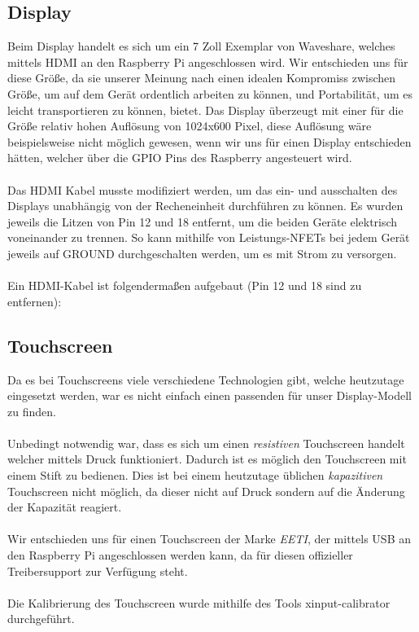 \subsection{Display}

Beim Display handelt es sich um ein 7 Zoll Exemplar von Waveshare, welches mittels HDMI an den Raspberry Pi angeschlossen wird. Wir entschieden uns für diese Größe, da sie unserer Meinung nach einen idealen Kompromiss zwischen Größe, um auf dem Gerät ordentlich arbeiten zu können, und Portabilität, um es leicht transportieren zu können, bietet. Das Display überzeugt mit einer für die Größe relativ hohen Auflösung von 1024x600 Pixel, diese Auflösung wäre beispielsweise nicht möglich gewesen, wenn wir uns für einen Display entschieden hätten, welcher über die GPIO Pins des Raspberry angesteuert wird.\\
\\
Das HDMI Kabel musste modifiziert werden, um das ein- und ausschalten des Displays unabhängig von der Recheneinheit durchführen zu können. Es wurden jeweils die Litzen von Pin 12 und 18 entfernt, um die beiden Geräte elektrisch voneinander zu trennen. So kann mithilfe von Leistungs-NFETs bei jedem Gerät jeweils auf GROUND durchgeschalten werden, um es mit Strom zu versorgen.\\
\\
Ein HDMI-Kabel ist folgendermaßen aufgebaut (Pin 12 und 18 sind zu entfernen): 

\subsection{Touchscreen}

Da es bei Touchscreens viele verschiedene Technologien gibt, welche heutzutage eingesetzt werden, war es nicht einfach einen passenden für unser Display-Modell zu finden.\\
\\
Unbedingt notwendig war, dass es sich um einen \textit{resistiven} Touchscreen handelt welcher mittels Druck funktioniert. Dadurch ist es möglich den Touchscreen mit einem Stift zu bedienen. Dies ist bei einem heutzutage üblichen \textit{kapazitiven} Touchscreen nicht möglich, da dieser nicht auf Druck sondern auf die Änderung der Kapazität reagiert.\\
\\
Wir entschieden uns für einen Touchscreen der Marke \textit{EETI}, der mittels USB an den Raspberry Pi angeschlossen werden kann, da für diesen offizieller Treibersupport zur Verfügung steht.\\
\\
Die Kalibrierung des Touchscreen wurde mithilfe des Tools xinput-calibrator durchgeführt.

